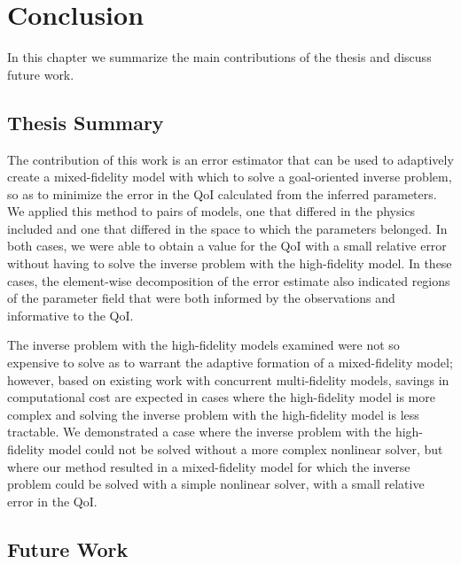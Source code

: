 \chapter{Conclusion} \label{chap:conc}
 
In this chapter we summarize the main contributions of the thesis and discuss future work. 
 
\section{Thesis Summary} 

The contribution of this work is an error estimator that can be used to adaptively create a mixed-fidelity model with which to solve a goal-oriented inverse problem, so as to minimize the error in the QoI calculated from the inferred parameters. We applied this method to pairs of models, one that differed in the physics included and one that differed in the space to which the parameters belonged. In both cases, we were able to obtain a value for the QoI with a small relative error without having to solve the inverse problem with the high-fidelity model. In these cases, the element-wise decomposition of the error estimate also indicated regions of the parameter field that were both informed by the observations and informative to the QoI. 

The inverse problem with the high-fidelity models examined were not so expensive to solve as to warrant the adaptive formation of a mixed-fidelity model; however, based on existing work with concurrent multi-fidelity models, savings in computational cost are expected in cases where the high-fidelity model is more complex and solving the inverse problem with the high-fidelity model is less tractable. We demonstrated a case where the inverse problem with the high-fidelity model could not be solved without a more complex nonlinear solver, but where our method resulted in a mixed-fidelity model for which the inverse problem could be solved with a simple nonlinear solver, with a small relative error in the QoI.

\section{Future Work} 

